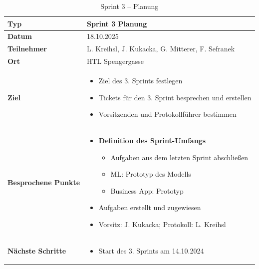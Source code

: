 \documentclass{article}
\begin{document}
\begin{table}[htbp]
  \centering
  \begin{tabularx}{\textwidth}{|>{\columncolor{black!10}}l|X|}
    \hline
    \textbf{Typ} & Sprint 3 Planung \\ 
    \hline
    \textbf{Datum} & 18.10.2025 \\ 
    \hline
    \textbf{Teilnehmer} & L. Kreihsl, J. Kukacka, G. Mitterer, F. Sefranek \\ 
    \hline
    \textbf{Ort} & HTL Spengergasse \\ 
    \hline
    \textbf{Ziel} &
    \vspace{-0.5em}
    \begin{itemize}
        \item Ziel des 3. Sprints festlegen
        \item Tickets für den 3. Sprint besprechen und erstellen
        \item Vorsitzenden und Protokollführer bestimmen
    \end{itemize} \\
    \hline
    \textbf{Besprochene Punkte} &
    \vspace{-0.5em}
    \begin{itemize}
        \item \textbf{Definition des Sprint-Umfangs}
        \begin{itemize}
            \item Aufgaben aus dem letzten Sprint abschließen
            \item ML: Prototyp des Modells
            \item Business App: Prototyp
        \end{itemize}
        \item Aufgaben erstellt und zugewiesen
        \item Vorsitz: J. Kukacka; Protokoll: L. Kreihsl
    \end{itemize} \\
    \hline
    \textbf{Nächste Schritte} &
    \vspace{-0.5em}
    \begin{itemize}
        \item Start des 3. Sprints am 14.10.2024
    \end{itemize} \\
    \hline
  \end{tabularx}
  \caption{Sprint 3 – Planung}
  \label{tab:meeting-sprint3}
\end{table}
\end{document}
